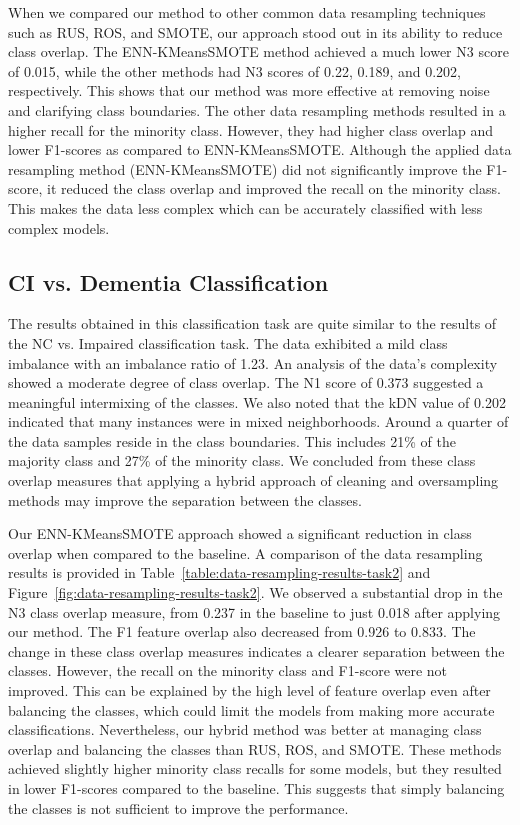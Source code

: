 When we compared our method to other common data resampling techniques such as RUS, ROS, and SMOTE, our approach stood out in its ability to reduce class overlap. The ENN-KMeansSMOTE method achieved a much lower N3 score of 0.015, while the other methods had N3 scores of 0.22, 0.189, and 0.202, respectively. This shows that our method was more effective at removing noise and clarifying class boundaries. The other data resampling methods resulted in a higher recall for the minority class. However, they had higher class overlap and lower F1-scores as compared to ENN-KMeansSMOTE. Although the applied data resampling method (ENN-KMeansSMOTE) did not significantly improve the F1-score, it reduced the class overlap and improved the recall on the minority class. This makes the data less complex which can be accurately classified with less complex models.

\subsection{CI vs. Dementia Classification}
The results obtained in this classification task are quite similar to the results of the NC vs. Impaired classification task. The data exhibited a mild class imbalance with an imbalance ratio of 1.23. An analysis of the data's complexity showed a moderate degree of class overlap. The N1 score of 0.373 suggested a meaningful intermixing of the classes. We also noted that the kDN value of 0.202 indicated that many instances were in mixed neighborhoods. Around a quarter of the data samples reside in the class boundaries. This includes 21\% of the majority class and 27\% of the minority class. We concluded from these class overlap measures that applying a hybrid approach of cleaning and oversampling methods may improve the separation between the classes.

Our ENN-KMeansSMOTE approach showed a significant reduction in class overlap when compared to the baseline. A comparison of the data resampling results is provided in Table~\ref{table:data-resampling-results-task2} and Figure~\ref{fig:data-resampling-results-task2}. We observed a substantial drop in the N3 class overlap measure, from 0.237 in the baseline to just 0.018 after applying our method. The F1 feature overlap also decreased from 0.926 to 0.833. The change in these class overlap measures indicates a clearer separation between the classes. However, the recall on the minority class and F1-score were not improved. This can be explained by the high level of feature overlap even after balancing the classes, which could limit the models from making more accurate classifications. Nevertheless, our hybrid method was better at managing class overlap and balancing the classes than RUS, ROS, and SMOTE. These methods achieved slightly higher minority class recalls for some models, but they resulted in lower F1-scores compared to the baseline. This suggests that simply balancing the classes is not sufficient to improve the performance.

